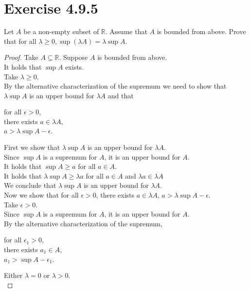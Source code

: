 \documentclass{article}
\theoremstyle{mytheoremstyle}
\theoremstyle{mytheoremstyle}
\theoremstyle{myproblemstyle}
\begin{document}
    \section{Exercise 4.9.5}
    \begin{problem}
        Let $A$ be a non-empty subset of $\mathbb{R}$. Assume that $A$ is bounded from above.
        Prove that for all $\lambda \ge 0, \sup(\lambda A) = \lambda \sup A$.
    \end{problem}
    \begin{proof}
        Take $A \subseteq \mathbb{R}$.
        Suppose $A$ is bounded from above. \\
        It holds that $\sup A$ exists. \\
        Take $\lambda \ge 0$. \\
        By the alternative characterization of the supremum we need to show that $\lambda \sup A$ is an upper bound for $\lambda A$ and that
        \begin{center}
            for all $\epsilon > 0$, \\
            there exists $a \in \lambda A$, \\
            $a > \lambda \sup A - \epsilon$.
        \end{center}

        First we show that $\lambda \sup A$ is an upper bound for $\lambda A$. \\
        Since $\sup A$ is a supremum for $A$, it is an upper bound for $A$. \\
        It holds that $\sup A \ge a$ for all $a \in A$. \\
        It holds that $\lambda \sup A \ge \lambda a$ for all $a \in A$ and $\lambda a \in \lambda A$ \\
        We conclude that $\lambda \sup A$ is an upper bound for $\lambda A$. \\

        Now we show that for all $\epsilon > 0$, there exists $a \in \lambda A$, $a > \lambda \sup A - \epsilon$. \\
        Take $\epsilon > 0$. \\
        Since $\sup A$ is a supremum for $A$, it is an upper bound for $A$. \\
        By the alternative characterization of the supremum, 
        \begin{center}
            for all $\epsilon_1 > 0$, \\
            there exists $a_1 \in A$, \\
            $a_1 > \sup A - \epsilon_1$. \\
        \end{center}
        Either $\lambda = 0$ or $\lambda > 0$. \\


\end{proof}
\end{document}
